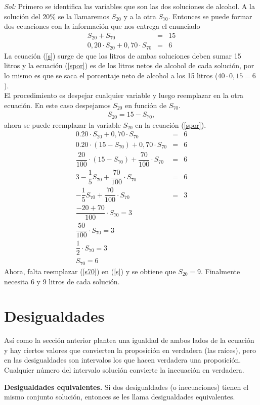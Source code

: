 \noindent\textit{Sol:} Primero se identifica las variables que son las dos soluciones de alcohol. A la solución del $20\%$ se la llamaremos $S_{20}$ y a la otra $S_{70}$. Entonces se puede formar dos ecuaciones con la información que nos entrega el enunciado 
\begin{eqnarray}
S_{20}+S_{70}&=&15 \label{s}\\
0,20\cdot S_{20}+0,70\cdot S_{70}&=&6\label{spor}
\end{eqnarray}
 La ecuación (\ref{s}) surge de que los litros de ambas soluciones deben sumar 15 litros y la ecuación (\ref{spor}) es de los litros netos de alcohol de cada solución, por lo mismo es que se saca el porcentaje neto de alcohol a los 15 litros ($40\cdot 0,15=6$). \\
 El procedimiento es despejar cualquier variable y luego reemplazar en la otra ecuación. En este caso despejamos $S_{20}$ en función de $S_{70}$.
\begin{eqnarray*}
S_{20}=15-S_{70},
\end{eqnarray*}
ahora se puede reemplazar la variable $S_{20}$ en la ecuación (\ref{spor}).
\begin{eqnarray}
0.20\cdot S_{20}+0,70\cdot S_{70}&=&6\nonumber\\
0.20\cdot (15-S_{70})+0,70\cdot S_{70}&=&6\nonumber\\
\dfrac{20}{100}\cdot (15-S_{70})+\dfrac{70}{100}\cdot S_{70}&=&6\nonumber\\
3-\dfrac{1}{5} S_{70}+\dfrac{70}{100}\cdot S_{70}&=&6\nonumber\\
-\dfrac{1}{5} S_{70}+\dfrac{70}{100}\cdot S_{70}&=&3\nonumber\\
\dfrac{-20+70}{100}\cdot S_{70}=3\nonumber\\
\dfrac{50}{100}\cdot S_{70}=3\nonumber\\
\dfrac{1}{2}\cdot S_{70}=3\nonumber\\
S_{70}=6\label{s70}
\end{eqnarray}
Ahora, falta reemplazar (\ref{s70}) en (\ref{s}) y se obtiene que $S_{20}=9$. Finalmente necesita 6 y 9 litros de cada solución.

\section{Desigualdades}
Así como la sección anterior plantea una igualdad de ambos lados de la ecuación y hay ciertos valores que convierten la proposición en verdadera (las raíces), pero en las desigualdades son intervalos los que hacen verdadera una proposición. Cualquier número del intervalo solución convierte la inecuación en verdadera.\\
\begin{mydef}
\textbf{Desigualdades equivalentes.} Si dos desigualdades (o inecuaciones) tienen el mismo conjunto solución, entonces se les llama desigualdades equivalentes.\\
\end{mydef}

